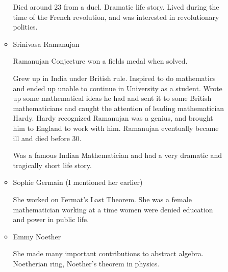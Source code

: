 \documentclass{report}
\begin{document}
\begin{description}
\begin{itemize}
\begin{mdframed}
\begin{itemize}
\begin{mdframed}
                               \vspace{10pt}

                               Died around 23 from a duel. Dramatic
                               life story. Lived during the time of the
                               French revolution, and was interested
                               in revolutionary politics.
                           \end{mdframed}
                       \item Srinivasa Ramanujan
                           \begin{mdframed}
                               Ramanujan Conjecture won a fields
                               medal when solved. 
                               \vspace{10pt}

                               Grew up in India under British rule.
                               Inspired to do mathematics and ended
                               up unable to continue in University as
                               a student. Wrote up some mathematical ideas
                               he had and sent it to some British
                               mathematicians and caught the attention
                               of leading mathematician Hardy.
                               Hardy recognized Ramanujan was a genius,
                               and brought him to England to work with
                               him. Ramanujan eventually became ill and
                               died before 30.

                               \vspace{10pt}

                               Was a famous Indian Mathematician and
                               had a very dramatic and tragically short
                               life story.
                           \end{mdframed}
                       \item Sophie Germain (I mentioned her earlier)
                           \begin{mdframed}
                               She worked on Fermat's Last Theorem.
                               She was a female mathematician working
                               at a time women were denied education
                               and power in public life.
                           \end{mdframed}
                       \item Emmy Noether
                           \begin{mdframed}
                               She made many important contributions
                               to abstract algebra. Noetherian ring,
                               Noether's theorem in physics.


\end{mdframed}
\end{itemize}
\end{mdframed}
\end{itemize}
\end{description}
\end{document}
